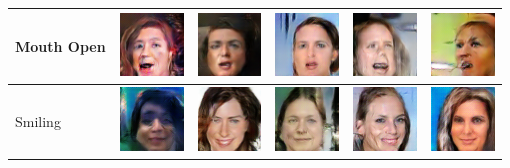 \begin{table}[ht]
\begin{tabular}{|llllll|}
Mouth Open  & \includegraphics[width=1.69cm, height=1.69cm]{Files/images/images11/image70.png}  &\includegraphics[width=1.69cm, height=1.69cm]{Files/images/images11/image69.png}   & \includegraphics[width=1.69cm, height=1.69cm]{Files/images/images11/image65.png}  & \includegraphics[width=1.69cm, height=1.69cm]{Files/images/images11/image37.png}  & \includegraphics[width=1.69cm, height=1.69cm]{Files/images/images11/image7.png} \\ \hline

Smiling  & \includegraphics[width=1.69cm, height=1.69cm]{Files/images/images15/image70.png}  &\includegraphics[width=1.69cm, height=1.69cm]{Files/images/images15/image7.png}   & \includegraphics[width=1.69cm, height=1.69cm]{Files/images/images15/image47.png}  & \includegraphics[width=1.69cm, height=1.69cm]{Files/images/images15/image37.png}  & \includegraphics[width=1.69cm, height=1.69cm]{Files/images/images15/image76.png} \\ \hline


\end{tabular}
\end{table}
